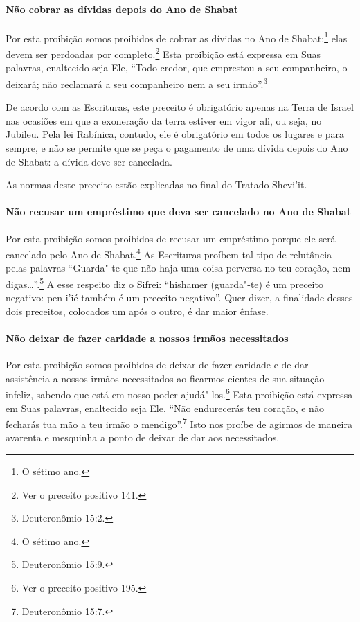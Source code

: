 \begin{multicols}{2}
\paragraph{Não cobrar as dívidas depois do Ano de Shabat}

Por esta proibição somos proibidos de cobrar as dívidas no Ano de
Shabat;\footnote{O sétimo ano.} elas devem ser perdoadas por
completo.\footnote{Ver o preceito positivo 141.} Esta proibição está expressa em Suas
palavras, enaltecido seja Ele, ``Todo credor, que emprestou a seu
companheiro, o deixará; não reclamará a seu companheiro nem a seu
irmão''.\footnote{Deuteronômio 15:2.}

De acordo com as Escrituras, este preceito é obrigatório apenas na Terra
de Israel nas ocasiões em que a exoneração da terra estiver em vigor
ali, ou seja, no Jubileu. Pela lei Rabínica, contudo, ele é obrigatório
em todos os lugares e para sempre, e não se permite que se peça o
pagamento de uma dívida depois do Ano de Shabat: a dívida deve ser
cancelada.

As normas deste preceito estão explicadas no final do Tratado Shevi'it\starr.

\paragraph{Não recusar um empréstimo que deva ser cancelado no Ano de Shabat}

Por esta proibição somos proibidos de recusar um empréstimo porque ele
será cancelado pelo Ano de Shabat.\footnote{O sétimo ano.} As Escrituras
proíbem tal tipo de relutância pelas palavras ``Guarda"-te que não haja
uma coisa perversa no teu coração, nem digas\ldots{}''.\footnote{Deuteronômio 15:9.} A
esse respeito diz o Sifrei\starr: ``hishamer\starr{} (guarda"-te) é um preceito
negativo: pen i'ié\starr{} também é um preceito negativo''.
Quer dizer, a finalidade desses dois preceitos, colocados um após o
outro, é dar maior ênfase.

\paragraph{Não deixar de fazer caridade a nossos irmãos necessitados}

Por esta proibição somos proibidos de deixar de fazer caridade e de dar
assistência a nossos irmãos necessitados ao ficarmos cientes de sua
situação infeliz, sabendo que está em nosso poder
ajudá"-los.\footnote{Ver o preceito positivo 195.} Esta proibição está expressa em Suas
palavras, enaltecido seja Ele, ``Não endurecerás teu coração, e não
fecharás tua mão a teu irmão o mendigo''.\footnote{Deuteronômio 15:7.} Isto nos
proíbe de agirmos de maneira avarenta e mesquinha a ponto de deixar de
dar aos necessitados.


\end{multicols}
